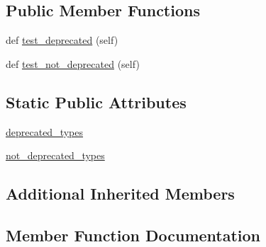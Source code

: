 \subsection*{Public Member Functions}
\begin{DoxyCompactItemize}
\item 
def \hyperlink{classnumpy_1_1core_1_1tests_1_1test__deprecations_1_1BuiltInRoundComplexDType_ae860382df585fdb628f0fa5f2f5ff505}{test\+\_\+deprecated} (self)
\item 
def \hyperlink{classnumpy_1_1core_1_1tests_1_1test__deprecations_1_1BuiltInRoundComplexDType_a0927877e71a2594f339163fede37dffa}{test\+\_\+not\+\_\+deprecated} (self)
\end{DoxyCompactItemize}
\subsection*{Static Public Attributes}
\begin{DoxyCompactItemize}
\item 
\hyperlink{classnumpy_1_1core_1_1tests_1_1test__deprecations_1_1BuiltInRoundComplexDType_a53c1c10621081a2b06410586c682395f}{deprecated\+\_\+types}
\item 
\hyperlink{classnumpy_1_1core_1_1tests_1_1test__deprecations_1_1BuiltInRoundComplexDType_af5ef2e86add5e6444006ade746aadd99}{not\+\_\+deprecated\+\_\+types}
\end{DoxyCompactItemize}
\subsection*{Additional Inherited Members}


\subsection{Member Function Documentation}
\mbox{\label{classnumpy_1_1core_1_1tests_1_1test__deprecations_1_1BuiltInRoundComplexDType_ae860382df585fdb628f0fa5f2f5ff505}} 
